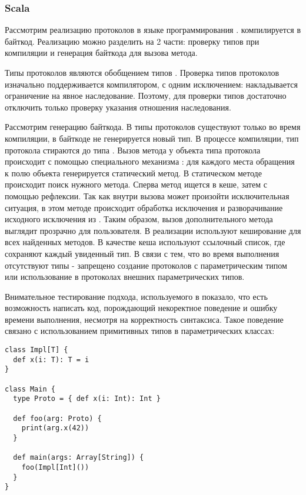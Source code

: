 \subsubsection{Scala}
Рассмотрим реализацию протоколов в языке программирования \cite{scala:structural}.  компилируется в  байткод. Реализацию можно разделить на 2 части: проверку типов при компиляции и генерация байткода для вызова метода.

Типы протоколов являются обобщением типов . Проверка типов протоколов изначально поддерживается компилятором, с одним исключением: накладывается ограничение на явное наследование. Поэтому, для проверки типов достаточно отключить только проверку указания отношения наследования.

Рассмотрим генерацию байткода. В  типы протоколов существуют только во время компиляции, в байткоде не генерируется новый тип. В процессе компиляции, тип протокола стираются до типа . Вызов метода у объекта типа протокола происходит с помощью специального механизма : для каждого места обращения к полю объекта генерируется статический метод. В статическом методе происходит поиск нужного метода. Сперва метод ищется в кеше, затем с помощью рефлексии. Так как внутри вызова может произойти исключительная ситуация, в этом методе происходит обработка исключения и разворачивание исходного исключения из . Таким образом, вызов дополнительного метода выглядит прозрачно для пользователя. В реализации используют кеширование для всех найденных методов. В качестве кеша используют ссылочный список, где сохраняют каждый увиденный тип. В связи с тем, что во время выполнения отсутствуют типы - запрещено создание протоколов с параметрическим типом или использование в протоколах внешних параметрических типов.

Внимательное тестирование подхода, используемого в  показало, что есть возможность написать код, порождающий некоректное поведение и ошибку времени выполнения, несмотря на корректность синтаксиса. Такое поведение связано с использованием примитивных типов в параметрических классах:

\begin{verbatim}
class Impl[T] {
  def x(i: T): T = i
}

class Main {
  type Proto = { def x(i: Int): Int }

  def foo(arg: Proto) {
    print(arg.x(42))
  }

  def main(args: Array[String]) {
    foo(Impl[Int]())
  }
}
\end{verbatim}

